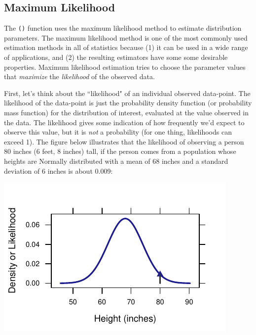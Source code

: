\documentclass[twoside]{book}\usepackage[]{graphicx}\usepackage[]{xcolor}
\makeatletter
\def\maxwidth{ %
  \ifdim\Gin@nat@width>\linewidth
    \linewidth
  \else
    \Gin@nat@width
  \fi
}
\newenvironment{knitrout}{}{} %
\newcommand{\Rindex}[1]{\index{\texttt{#1}}}
\newcommand{\function}[1]{{\color{purple!75!blue}\texttt{\StrSubstitute{#1}{()}{}()}}\Rindex{#1}}
\makeatother
\begin{document}
\subsection{Maximum Likelihood}

The \function{fitdistr()} function uses the maximum likelihood method to estimate
distribution parameters.
The maximum likelihood method is one of the most commonly used estimation methods
in all of statistics because (1) it can be used in a wide range of applications,
and (2) the resulting estimators have some some desirable properties.  Maximum likelihood estimation tries to choose the parameter values that \emph{maximize} the \emph{likelihood} of the observed data.  

First, let's think about the ``likelihood" of an individual observed data-point.  The likelihood of the data-point is just the probability density function (or probability mass function) for the distribution of interest, evaluated at the value observed in the data. The likelihood gives some indication of how frequently we'd expect to observe this value, but it is \emph{not} a probability (for one thing, likelihoods can exceed 1).  The figure below illustrates that the likelihood of observing a person 80 inches (6 feet, 8 inches) tall, if the person comes from a population whose heights are Normally distributed with a mean of 68 inches and a standard deviation of 6 inches is about 0.009: 
\begin{knitrout}
\color{fgcolor}

{\centering \includegraphics[width=\maxwidth]{figures/fig-likelihood-1} 

}



\end{knitrout}
\end{document}
